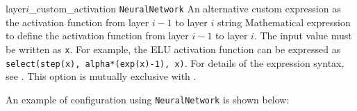 \begin{cvcoptions}
\item %
  \key
  {layer$i$\_custom\_activation}%
  {\texttt{NeuralNetwork}}%
  {An alternative custom expression as the activation function
   from layer $i-1$ to layer $i$}%
  {string}%
  {Mathematical expression to define the activation function from layer $i-1$
   to layer $i$. The input value must be written as \texttt{x}. For example,
   the ELU activation function can be expressed as
   \texttt{select(step(x), alpha*(exp(x)-1), x)}.
   For details of the expression syntax, see .
   This option is mutually exclusive with
   .}

\end{cvcoptions}

An example of configuration using \texttt{NeuralNetwork} is shown below:

